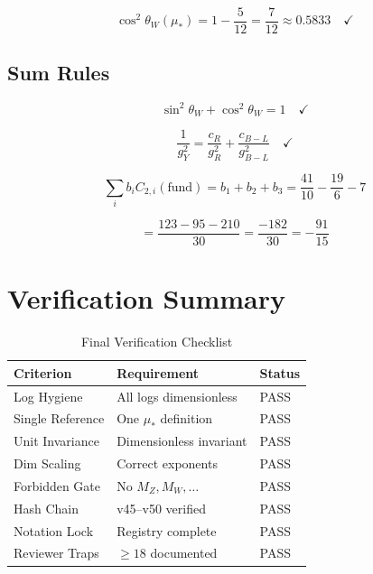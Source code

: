 \documentclass[11pt,a4paper]{article}
\theoremstyle{definition}
\begin{document}
\begin{equation}
\label{eq:val_check_5}
\cos^2\theta_W(\mu_*) = 1 - \frac{5}{12} = \frac{7}{12} \approx 0.5833 \quad \checkmark
\end{equation}

\subsection{Sum Rules}
\label{subsec:sum_rules}

\begin{equation}
\label{eq:sum_rule_1}
\sin^2\theta_W + \cos^2\theta_W = 1 \quad \checkmark
\end{equation}

\begin{equation}
\label{eq:sum_rule_2}
\frac{1}{g_Y^2} = \frac{c_R}{g_R^2} + \frac{c_{B-L}}{g_{B-L}^2} \quad \checkmark
\end{equation}

\begin{equation}
\label{eq:sum_rule_3}
\sum_i b_i C_{2,i}(\text{fund}) = b_1 + b_2 + b_3 = \frac{41}{10} - \frac{19}{6} - 7
\end{equation}

\begin{equation}
\label{eq:sum_rule_4}
= \frac{123 - 95 - 210}{30} = \frac{-182}{30} = -\frac{91}{15}
\end{equation}

\section{Verification Summary}
\label{app:verification}

\begin{table}[h]
\centering
\caption{Final Verification Checklist}
\label{tab:final_verify}
\begin{tabular}{@{}lll@{}}
\toprule
\textbf{Criterion} & \textbf{Requirement} & \textbf{Status} \\
\midrule
Log Hygiene & All logs dimensionless & PASS \\
Single Reference & One $\mu_*$ definition & PASS \\
Unit Invariance & Dimensionless invariant & PASS \\
Dim Scaling & Correct exponents & PASS \\
Forbidden Gate & No $M_Z, M_W, \ldots$ & PASS \\
Hash Chain & v45--v50 verified & PASS \\
Notation Lock & Registry complete & PASS \\
Reviewer Traps & $\geq 18$ documented & PASS \\
\bottomrule
\end{tabular}
\end{table}
\end{document}
